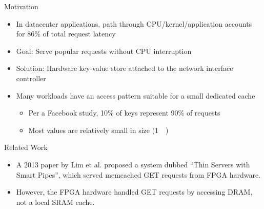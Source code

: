 \begin{block}{Motivation}
    \footnotesize
    \begin{itemize}
        \item In datacenter applications, path through CPU/kernel/application accounts for 86\% of total request latency
        \item \alert{Goal}: Serve popular requests without CPU interruption
        \item \alert{Solution}: Hardware key-value store attached to the network interface controller
        \item Many workloads have an access pattern suitable for a small
        dedicated cache
            \begin{itemize}
                \footnotesize
                \item Per a Facebook study, 10\% of keys represent 90\% of requests
                \item Most values are relatively small in size (\SI{1}{\kilo\byte})
            \end{itemize}

    \end{itemize}

\end{block}

\vspace{1ex}

\begin{block}{Related Work}
\footnotesize
\begin{itemize}
    \item A 2013 paper by Lim et al. proposed a system dubbed
        ``Thin Servers with Smart Pipes'', which served memcached GET requests
        from FPGA hardware.
    \item However, the FPGA hardware handled GET requests by accessing DRAM,
        not a local SRAM cache.
\end{itemize}

\end{block}
